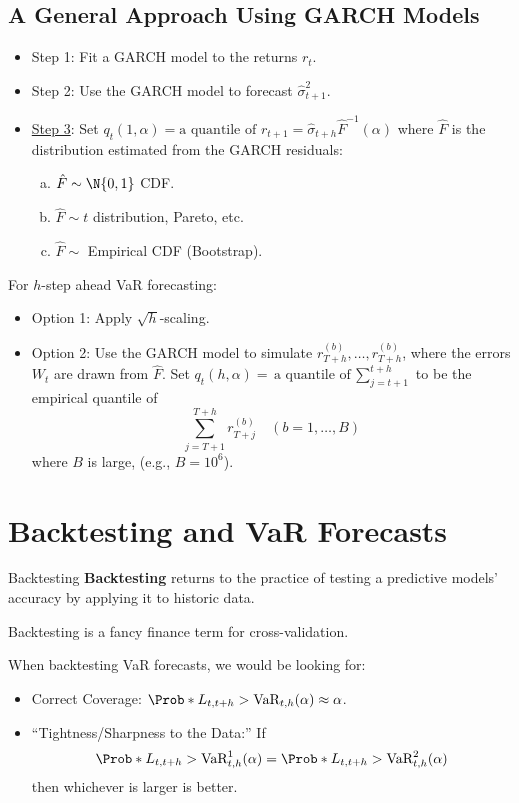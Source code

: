 \subsection*{A General Approach Using GARCH Models}
\begin{itemize}
    \item Step 1: Fit a GARCH model to the returns $ r_t $.
    \item Step 2: Use the GARCH model to forecast $ \hat{\sigma}_{t+1}^2 $.
    \item \underline{Step 3}: Set $ q_t(1,\alpha)=\text{a quantile of $r_{t+1}$}=\hat{\sigma}_{t+h}\hat{F}^{-1}(\alpha) $
          where $ \hat{F} $ is the distribution estimated from the GARCH residuals:
          \begin{enumerate}[(a)]
              \item $ \hat{F}\sim \N{0,1} $ CDF\@.
              \item $ \hat{F}\sim t $ distribution, Pareto, etc.
              \item $ \hat{F}\sim $ Empirical CDF (Bootstrap)\@.
          \end{enumerate}
\end{itemize}
For $ h $-step ahead VaR forecasting:
\begin{itemize}
    \item Option 1: Apply $ \sqrt{h} $-scaling.
    \item Option 2: Use the GARCH model to simulate $ r_{T+h}^{(b)},\ldots,r_{T+h}^{(b)} $,
          where the errors $ W_t $ are drawn from $ \hat{F} $. Set $ q_t(h,\alpha)=\text{a quantile of $\sum_{j=t+1}^{t+h} $}$
          to be the empirical quantile of
          \[ \sum_{j=T+1}^{T+h} r_{T+j}^{(b)}\quad(b=1,\ldots,B) \]
          where $ B $ is large, (e.g., $B=10^{6} $).
\end{itemize}
\section{Backtesting and VaR Forecasts}
\begin{Definition}{Backtesting}{}
    \textbf{Backtesting} returns to the practice of testing a predictive
    models' accuracy by applying it to historic data.
\end{Definition}
\begin{Remark}{}{}
    Backtesting is a fancy finance term for cross-validation.
\end{Remark}
When backtesting VaR forecasts, we would be looking for:
\begin{itemize}
    \item Correct Coverage: $ \Prob*{L_{t,t+h}>\text{VaR}_{t,h}(\alpha)}\approx \alpha $.
    \item ``Tightness/Sharpness to the Data:'' If
          \[ \Prob*{L_{t,t+h}>\text{VaR}^1_{t,h}(\alpha)}=\Prob*{L_{t,t+h}>\text{VaR}^2_{t,h}(\alpha)} \]
          then whichever is larger is better.
\end{itemize}
